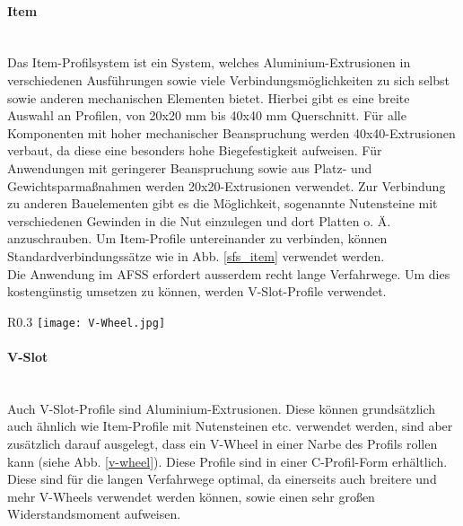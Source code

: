 \paragraph{Item}\mbox{}\\
Das Item-Profilsystem ist ein System, welches Aluminium-Extrusionen in verschiedenen Ausführungen sowie viele Verbindungsmöglichkeiten zu sich selbst sowie anderen mechanischen Elementen bietet. Hierbei gibt es eine breite Auswahl an Profilen, von 20x20 mm bis 40x40 mm Querschnitt. Für alle Komponenten mit hoher mechanischer Beanspruchung werden 40x40-Extrusionen verbaut, da diese eine besonders hohe Biegefestigkeit aufweisen. Für Anwendungen mit geringerer Beanspruchung sowie aus Platz- und Gewichtsparmaßnahmen werden 20x20-Extrusionen verwendet.
Zur Verbindung zu anderen Bauelementen gibt es die Möglichkeit, sogenannte Nutensteine mit verschiedenen Gewinden in die Nut einzulegen und dort Platten o. Ä. anzuschrauben. Um Item-Profile untereinander zu verbinden, können Standardverbindungssätze wie in Abb. \ref{sfs_item} verwendet werden.\\

Die Anwendung im AFSS erfordert ausserdem recht lange Verfahrwege. Um dies kostengünstig umsetzen zu können, werden V-Slot-Profile verwendet.


\begin{wrapfigure}{R}{0.3\textwidth}
    \texttt{[image: V-Wheel.jpg]}
    \centering
    \caption{V-Slot-Profil mit V-Wheel, Quelle: \cite{v_slot_wheel}}
    \label{v-wheel}
\end{wrapfigure}
\paragraph{V-Slot}\mbox{}\\
Auch V-Slot-Profile sind Aluminium-Extrusionen. Diese können grundsätzlich auch ähnlich wie Item-Profile mit Nutensteinen etc. verwendet werden, sind aber zusätzlich darauf ausgelegt, dass ein V-Wheel in einer Narbe des Profils rollen kann (siehe Abb. \ref{v-wheel}). Diese Profile sind in einer C-Profil-Form erhältlich. Diese sind für die langen Verfahrwege optimal, da einerseits auch breitere und mehr V-Wheels verwendet werden können, sowie einen sehr großen Widerstandsmoment aufweisen.


